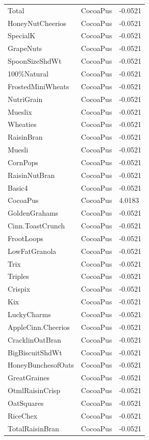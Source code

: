\begin{table}[!htbp]
\begin{tabular}{lll}
\\
Total & CocoaPus & -0.0521
\\
HoneyNutCheerios & CocoaPus & -0.0521
\\
SpecialK & CocoaPus & -0.0521
\\
GrapeNuts & CocoaPus & -0.0521
\\
SpoonSizeShdWt & CocoaPus & -0.0521
\\
100\%Natural & CocoaPus & -0.0521
\\
FrostedMiniWheats & CocoaPus & -0.0521
\\
NutriGrain & CocoaPus & -0.0521
\\
Mueslix & CocoaPus & -0.0521
\\
Wheaties & CocoaPus & -0.0521
\\
RaisinBran & CocoaPus & -0.0521
\\
Muesli & CocoaPus & -0.0521
\\
CornPops & CocoaPus & -0.0521
\\
RaisinNutBran & CocoaPus & -0.0521
\\
Basic4 & CocoaPus & -0.0521
\\
CocoaPus & CocoaPus & 4.0183
\\
GoldenGrahams & CocoaPus & -0.0521
\\
Cinn.ToastCrunch & CocoaPus & -0.0521
\\
FrootLoops & CocoaPus & -0.0521
\\
LowFatGranola & CocoaPus & -0.0521
\\
Trix & CocoaPus & -0.0521
\\
Triples & CocoaPus & -0.0521
\\
Crispix & CocoaPus & -0.0521
\\
Kix & CocoaPus & -0.0521
\\
LuckyCharms & CocoaPus & -0.0521
\\
AppleCinn.Cheerios & CocoaPus & -0.0521
\\
CracklinOatBran & CocoaPus & -0.0521
\\
BigBiscuitShdWt & CocoaPus & -0.0521
\\
HoneyBunchesofOats & CocoaPus & -0.0521
\\
GreatGraines & CocoaPus & -0.0521
\\
OtmlRaisinCrisp & CocoaPus & -0.0521
\\
OatSquares & CocoaPus & -0.0521
\\
RiceChex & CocoaPus & -0.0521
\\
TotalRaisinBran & CocoaPus & -0.0521
\\

\end{tabular}
\end{table}
